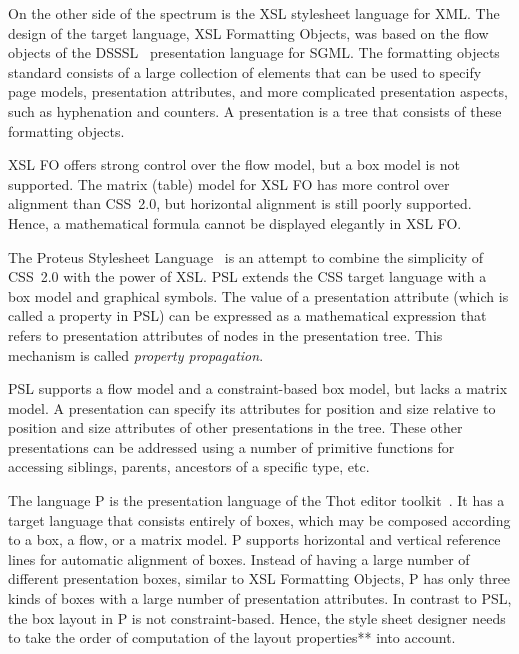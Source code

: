  On the other side of the spectrum is the XSL stylesheet language for XML. The design of the target language, XSL Formatting Objects, was based on the flow objects of the DSSSL~\cite{dsssl96} presentation language for SGML. The formatting objects standard consists of a large collection of elements that can be used to specify page models, presentation attributes, and more complicated presentation aspects, such as hyphenation and counters. A presentation is a tree that consists of these formatting objects. 

XSL FO offers strong control over the flow model, but a box model is not supported. The matrix (table) model for XSL FO has more control over alignment than CSS~2.0, but horizontal alignment is still poorly supported. Hence, a mathematical formula cannot be displayed elegantly in XSL FO.


 The Proteus Stylesheet Language~\cite{marden98psl} is an attempt to combine the simplicity of CSS~2.0 with the power of XSL. PSL extends the CSS target language with a box model and graphical symbols. The value of a presentation attribute (which is called a property in PSL) can be expressed as a mathematical expression that refers to presentation attributes of nodes in the presentation tree. This mechanism is called {\em property propagation}. 

PSL supports a flow model and a constraint-based box model, but lacks a matrix model. A presentation can specify its attributes for position and size relative to position and size attributes of other presentations in the tree. These other presentations can be addressed using a number of primitive functions for accessing siblings, parents, ancestors of a specific type, etc.

 The  language P is the presentation language of the Thot editor toolkit~\cite{quint97thot}. It has a target language that consists entirely of boxes, which may be composed according to a box, a flow, or a matrix model. P supports horizontal and vertical reference lines for automatic alignment of boxes. Instead of having a large number of different presentation boxes, similar to XSL Formatting Objects, P has only three kinds of boxes with a large number of presentation attributes. In contrast to PSL, the box layout in P is not constraint-based. \bc Hence, the style sheet designer needs to take the order of computation of the layout properties** into account. \ec 

